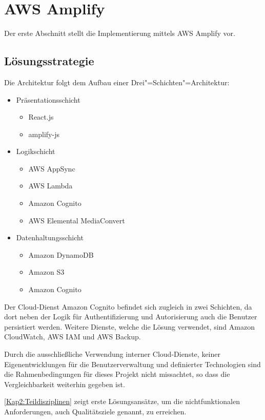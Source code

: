 \section{AWS Amplify}

Der erste Abschnitt stellt die Implementierung mittels \ac{AWS} Amplify vor.

\subsection{Lösungsstrategie}

Die Architektur folgt dem Aufbau einer Drei"=Schichten"=Architektur:

\begin{itemize}
  \item Präsentationsschicht
    \begin{itemize}
      \item React.js
      \item amplify-js
    \end{itemize}
  \item Logikschicht
    \begin{itemize}
      \item AWS AppSync
      \item AWS Lambda
      \item Amazon Cognito
      \item AWS Elemental MediaConvert
    \end{itemize}
  \item Datenhaltungsschicht
    \begin{itemize}
      \item Amazon DynamoDB
      \item Amazon S3
      \item Amazon Cognito
    \end{itemize}
\end{itemize}

Der Cloud-Dienst Amazon Cognito befindet sich zugleich in zwei Schichten, da dort neben der Logik für Authentifizierung und Autorisierung auch die Benutzer persistiert werden. Weitere Dienste, welche die Lösung verwendet, sind Amazon CloudWatch, AWS IAM und AWS Backup.

Durch die ausschließliche Verwendung interner Cloud-Dienste, keiner Eigenentwicklungen für die Benutzerverwaltung und definierter Technologien sind die Rahmenbedingungen für dieses Projekt nicht missachtet, so dass die Vergleichbarkeit weiterhin gegeben ist.

\autoref{Kap2:Teildisziplinen} zeigt erste Lösungsansätze, um die nichtfunktionalen Anforderungen, auch Qualitätsziele genannt, zu erreichen.

